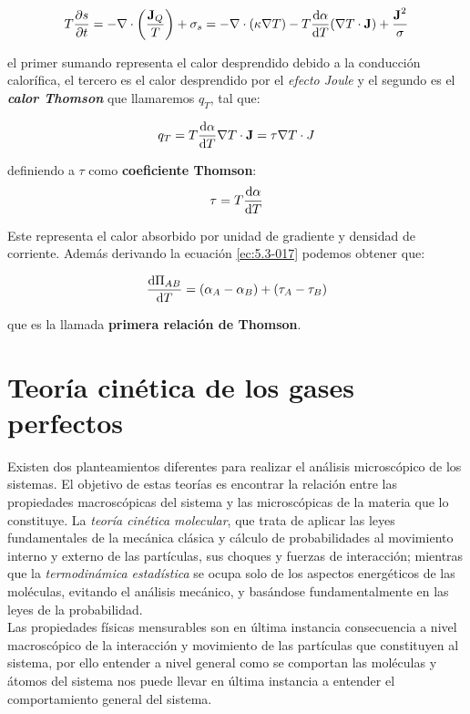\documentclass[12pt]{book}
\begin{document}
\begin{equation}
T \frac{\partial s}{\partial t}  = - \nabla \cdot \left(  \dfrac{\textbf{J}_Q}{T} \right) + \sigma_s = - \nabla \cdot (\kappa \nabla T) - T \dfrac{\mathrm{d} \alpha}{\mathrm{d} T} (\nabla T \cdot \textbf{J}) + \dfrac{\textbf{J}^2}{\sigma}
\end{equation}

el primer sumando representa el calor desprendido debido a la conducción calorífica, el tercero es el calor desprendido por el \textit{efecto Joule} y el segundo es el
\textit{\textbf{calor Thomson}} que llamaremos $q_T$, tal que:

\begin{equation}
q_T = T \dfrac{\mathrm{d} \alpha}{\mathrm{d} T} \nabla T \cdot \textbf{J} = \tau \nabla T \cdot J
\end{equation} 

definiendo a $\tau$ como \textbf{coeficiente Thomson}:
\begin{equation}
\tau = T \dfrac{\mathrm{d} \alpha}{\mathrm{d} T}
\end{equation}

 Este representa el calor absorbido por unidad de gradiente y densidad de corriente. Además derivando la ecuación \ref{ec:5.3-017} podemos obtener que:

\begin{equation}
\dfrac{\mathrm{d} \Pi_{AB}}{\mathrm{d} T} = (\alpha_A - \alpha_B) + (\tau_A - \tau_B)
\end{equation}

que es la llamada \textbf{primera relación de Thomson}.

\chapter{Teoría cinética de los gases perfectos}

Existen dos planteamientos diferentes para realizar el análisis microscópico de los sistemas. El objetivo de estas teorías es encontrar la relación entre las propiedades macroscópicas del sistema y las microscópicas de la materia que lo constituye. La \textit{teoría cinética molecular}, que trata de aplicar las leyes fundamentales de la mecánica clásica y cálculo de probabilidades al movimiento interno y externo de las partículas, sus choques y fuerzas de interacción; mientras que la \textit{termodinámica estadística} se ocupa solo de los aspectos energéticos de  las moléculas, evitando el análisis mecánico, y basándose fundamentalmente en las leyes de la probabilidad. \\

Las propiedades físicas mensurables son en última instancia consecuencia a nivel macroscópico de la interacción y movimiento de las partículas que constituyen al sistema, por ello entender a nivel general como se comportan las moléculas y átomos del sistema nos puede llevar en última instancia a entender el comportamiento general del sistema. \\ 
\end{document}
